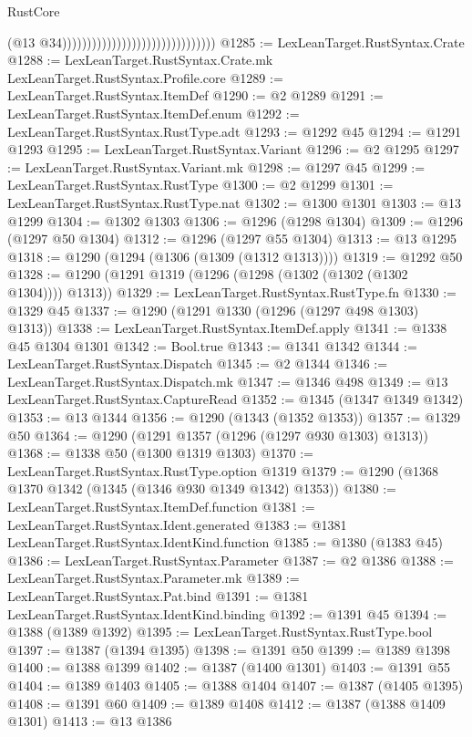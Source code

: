 \begin{lexlean}{RustCore}
\begin{coremodule}
                                                                (@13
                                                                  @34)))))))))))))))))))))))))))))))
@1285 := LexLeanTarget.RustSyntax.Crate
@1288 := LexLeanTarget.RustSyntax.Crate.mk LexLeanTarget.RustSyntax.Profile.core
@1289 := LexLeanTarget.RustSyntax.ItemDef
@1290 := @2 @1289
@1291 := LexLeanTarget.RustSyntax.ItemDef.enum
@1292 := LexLeanTarget.RustSyntax.RustType.adt
@1293 := @1292 @45
@1294 := @1291 @1293
@1295 := LexLeanTarget.RustSyntax.Variant
@1296 := @2 @1295
@1297 := LexLeanTarget.RustSyntax.Variant.mk
@1298 := @1297 @45
@1299 := LexLeanTarget.RustSyntax.RustType
@1300 := @2 @1299
@1301 := LexLeanTarget.RustSyntax.RustType.nat
@1302 := @1300 @1301
@1303 := @13 @1299
@1304 := @1302 @1303
@1306 := @1296 (@1298 @1304)
@1309 := @1296 (@1297 @50 @1304)
@1312 := @1296 (@1297 @55 @1304)
@1313 := @13 @1295
@1318 := @1290 (@1294 (@1306 (@1309 (@1312 @1313))))
@1319 := @1292 @50
@1328 := @1290 (@1291 @1319 (@1296 (@1298 (@1302 (@1302 (@1302 @1304)))) @1313))
@1329 := LexLeanTarget.RustSyntax.RustType.fn
@1330 := @1329 @45
@1337 := @1290 (@1291 @1330 (@1296 (@1297 @498 @1303) @1313))
@1338 := LexLeanTarget.RustSyntax.ItemDef.apply
@1341 := @1338 @45 @1304 @1301
@1342 := Bool.true
@1343 := @1341 @1342
@1344 := LexLeanTarget.RustSyntax.Dispatch
@1345 := @2 @1344
@1346 := LexLeanTarget.RustSyntax.Dispatch.mk
@1347 := @1346 @498
@1349 := @13 LexLeanTarget.RustSyntax.CaptureRead
@1352 := @1345 (@1347 @1349 @1342)
@1353 := @13 @1344
@1356 := @1290 (@1343 (@1352 @1353))
@1357 := @1329 @50
@1364 := @1290 (@1291 @1357 (@1296 (@1297 @930 @1303) @1313))
@1368 := @1338 @50 (@1300 @1319 @1303)
@1370 := LexLeanTarget.RustSyntax.RustType.option @1319
@1379 := @1290 (@1368 @1370 @1342 (@1345 (@1346 @930 @1349 @1342) @1353))
@1380 := LexLeanTarget.RustSyntax.ItemDef.function
@1381 := LexLeanTarget.RustSyntax.Ident.generated
@1383 := @1381 LexLeanTarget.RustSyntax.IdentKind.function
@1385 := @1380 (@1383 @45)
@1386 := LexLeanTarget.RustSyntax.Parameter
@1387 := @2 @1386
@1388 := LexLeanTarget.RustSyntax.Parameter.mk
@1389 := LexLeanTarget.RustSyntax.Pat.bind
@1391 := @1381 LexLeanTarget.RustSyntax.IdentKind.binding
@1392 := @1391 @45
@1394 := @1388 (@1389 @1392)
@1395 := LexLeanTarget.RustSyntax.RustType.bool
@1397 := @1387 (@1394 @1395)
@1398 := @1391 @50
@1399 := @1389 @1398
@1400 := @1388 @1399
@1402 := @1387 (@1400 @1301)
@1403 := @1391 @55
@1404 := @1389 @1403
@1405 := @1388 @1404
@1407 := @1387 (@1405 @1395)
@1408 := @1391 @60
@1409 := @1389 @1408
@1412 := @1387 (@1388 @1409 @1301)
@1413 := @13 @1386

\end{coremodule}
\end{lexlean}
